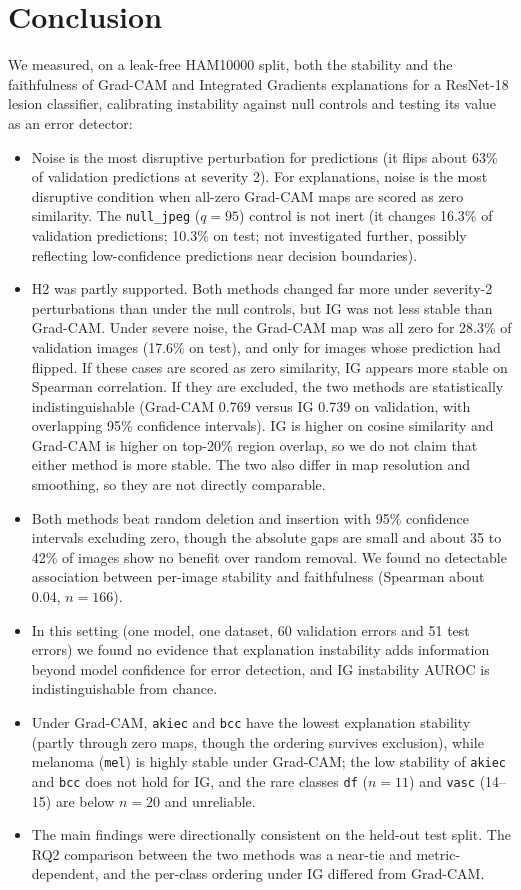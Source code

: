 \documentclass[conference]{IEEEtran}
\begin{document}
\section{Conclusion}
We measured, on a leak-free HAM10000 split, both the stability and the
faithfulness of Grad-CAM and Integrated Gradients explanations for a
ResNet-18 lesion classifier, calibrating instability against null controls
and testing its value as an error detector:
\begin{itemize}
\item Noise is the most disruptive perturbation for predictions (it flips
about 63\% of validation predictions at severity 2). For explanations, noise
is the most disruptive condition when all-zero Grad-CAM maps are scored as zero
similarity. The \texttt{null\_jpeg} ($q{=}95$) control is not inert (it changes
16.3\% of validation predictions; 10.3\% on test; not investigated
further, possibly reflecting low-confidence predictions near decision
boundaries).
\item H2 was partly supported. Both methods changed far more under
severity-2 perturbations than under the null controls, but IG was not less
stable than Grad-CAM. Under severe noise, the Grad-CAM map was all zero
for 28.3\% of validation images (17.6\% on test), and only for images whose
prediction had flipped. If these cases are scored as zero similarity, IG
appears more stable on Spearman correlation. If they are excluded, the two
methods are statistically indistinguishable (Grad-CAM 0.769 versus IG 0.739
on validation, with overlapping 95\% confidence intervals). IG is higher on
cosine similarity and Grad-CAM is higher on top-20\% region overlap, so we
do not claim that either method is more stable. The two also differ
in map resolution and smoothing, so they are not directly comparable.
\item Both methods beat random deletion and insertion with 95\% confidence
intervals excluding zero, though the absolute gaps are small and about
35 to 42\% of images show no benefit over random removal. We found no
detectable association between per-image stability and faithfulness
(Spearman about 0.04, $n{=}166$).
\item In this setting (one model, one dataset, 60 validation errors and 51
test errors) we found no evidence that explanation instability adds
information beyond model confidence for error detection, and IG instability
AUROC is indistinguishable from chance.
\item Under Grad-CAM, \texttt{akiec} and \texttt{bcc} have the lowest
explanation stability (partly through zero maps, though the ordering
survives exclusion), while melanoma (\texttt{mel}) is highly stable under
Grad-CAM; the low stability of \texttt{akiec} and \texttt{bcc} does not
hold for IG, and the rare classes \texttt{df} ($n{=}11$) and \texttt{vasc} (14--15)
are below $n{=}20$ and unreliable.
\item The main findings were directionally consistent on the held-out test
split. The RQ2 comparison between the two methods was a near-tie and
metric-dependent, and the per-class ordering under IG differed from Grad-CAM.
\end{itemize}
\end{document}
